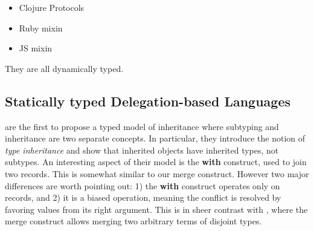 \begin{itemize}
\item Clojure Protocols
\item Ruby mixin
\item JS mixin
\end{itemize}

They are all dynamically typed.

\subsection{Statically typed Delegation-based Languages}

\citet{cook1989inheritance} are the first to propose a typed model of
inheritance where subtyping and inheritance are two separate concepts. In
particular, they introduce the notion of \textit{type inheritance} and show that
inherited objects have inherited types, not subtypes. An interesting aspect of
their model is the \textbf{with} construct, used to join two records. This is
somewhat similar to our merge construct. However two major differences are worth
pointing out: 1) the \textbf{with} construct operates only on records, and 2) it
is a biased operation, meaning the conflict is resolved by favoring values from
its right argument. This is in sheer contrast with \name, where the merge
construct allows merging two arbitrary terms of disjoint types. 






